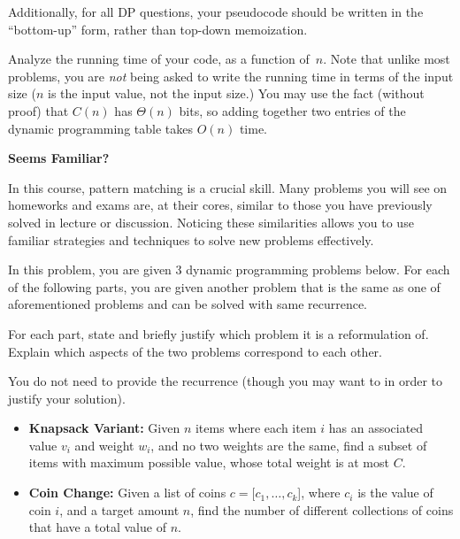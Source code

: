 \documentclass[11pt,addpoints]{exam}
\begin{document}
\begin{questions}
\begin{parts}
Additionally, for all DP questions, your pseudocode should be written in the ``bottom-up'' form, rather than top-down memoization. 
    

    
    Analyze the running time of your code, as a function of~$n$. Note that unlike most problems, you are \textit{not} being asked to write the running time in terms of the input size ($n$ is the input value, not the input size.) You may use the fact (without proof) that $C(n)$ has $\Theta(n)$ bits, so adding together two entries of the dynamic programming table takes $O(n)$ time. 

        \begin{solution}
        \end{solution}

    \end{parts}


\question \textbf{Seems Familiar?}


  In this course, pattern matching is a crucial skill. Many problems you will see on homeworks and exams are, at their cores, similar to those you have previously solved in lecture or discussion. Noticing these similarities allows you to use familiar strategies and techniques to solve new problems effectively. 
  
  In this problem, you are given 3  dynamic programming problems below. For each of the following parts, you are given another problem that is the same as one of aforementioned problems and can be solved with same recurrence. 
  
  For each part, state and briefly justify which problem it  is a reformulation of. Explain which aspects of the two problems correspond to each other. 

  You do not need to provide the recurrence (though you may want to in order to justify your solution). 

  \begin{itemize}
    \item \textbf{Knapsack Variant:} Given $n$ items where each item $i$ has an associated value $v_i$ and weight $w_i$, and no two weights are the same, find a subset of items with maximum possible value, whose total weight is at most $C$. 

        \item  \textbf{Coin Change:} Given a list of coins $c = [c_1,\ldots,c_k$], where $c_i$ is the value of coin $i$, and a target amount $n$, find the number of different collections of coins that have a total value of $n$. 


\end{itemize}
\end{questions}
\end{document}

